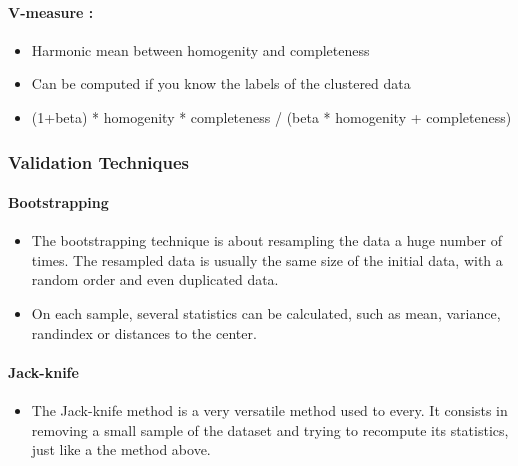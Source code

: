\documentclass[11pt]{article}
\providecommand{\tightlist}{%
      \setlength{\itemsep}{0pt}\setlength{\parskip}{0pt}}
\begin{document}
    \hypertarget{v-measure}{%
\paragraph{V-measure :}\label{v-measure}}

    \begin{itemize}
\tightlist
\item
  Harmonic mean between homogenity and completeness
\item
  Can be computed if you know the labels of the clustered data
\item
  (1+beta) * homogenity * completeness / (beta * homogenity +
  completeness)
\end{itemize}

    \hypertarget{validation-techniques}{%
\subsubsection{Validation Techniques}\label{validation-techniques}}

    \hypertarget{bootstrapping}{%
\paragraph{Bootstrapping}\label{bootstrapping}}

    \begin{itemize}
\tightlist
\item
  The bootstrapping technique is about resampling the data a huge number
  of times. The resampled data is usually the same size of the initial
  data, with a random order and even duplicated data.
\item
  On each sample, several statistics can be calculated, such as mean,
  variance, randindex or distances to the center.
\end{itemize}

    \hypertarget{jack-knife}{%
\paragraph{Jack-knife}\label{jack-knife}}

    \begin{itemize}
\tightlist
\item
  The Jack-knife method is a very versatile method used to every. It
  consists in removing a small sample of the dataset and trying to
  recompute its statistics, just like a the method above.
\end{itemize}
\end{document}
